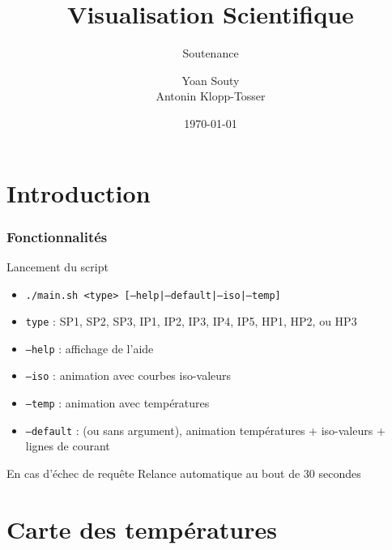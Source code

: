 \documentclass{beamer}
\title[Visu Scientifique]{Visualisation Scientifique}
\subtitle{Soutenance} %
\author{Yoan Souty\\Antonin Klopp-Tosser}
\institute{Ensimag}
\date{\today}
\begin{document}
\begin{frame}
  \titlepage
\end{frame}

\section[Intro]{Introduction}


\begin{frame} \frametitle{Fonctionnalités}

  \begin{block}{Lancement du script}
    \begin{itemize}
      \item \texttt{./main.sh <type> [--help|--default|--iso|--temp]}
      \item \texttt{type} : SP1, SP2, SP3, IP1, IP2, IP3, IP4, IP5, HP1, HP2, ou HP3
      \item \texttt{--help} : affichage de l'aide
      \item \texttt{--iso} : animation avec courbes iso-valeurs
      \item \texttt{--temp} : animation avec températures
      \item \texttt{--default} : (ou sans argument), animation températures + iso-valeurs + lignes de courant
    \end{itemize}
  \end{block}

  \begin{alertblock}{En cas d'échec de requ\^ete}
    Relance automatique au bout de 30 secondes
  \end{alertblock}
\end{frame}


\section[Températures]{Carte des températures}
\end{document}
